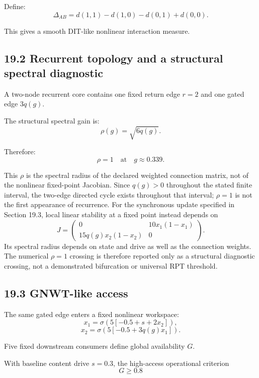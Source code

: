 \documentclass[
  11pt,
  a4paper,
]{article}
\begin{document}
Define:
\nopagebreak[4]
\[
\Delta_{AB}
=
d(1,1)-d(1,0)-d(0,1)+d(0,0).
\]

This gives a smooth DIT-like nonlinear interaction measure.

\hypertarget{recurrent-topology-and-a-structural-spectral-diagnostic}{%
\subsection{19.2 Recurrent topology and a structural spectral
diagnostic}\label{recurrent-topology-and-a-structural-spectral-diagnostic}}

A two-node recurrent core contains one fixed return edge \(r=2\) and one
gated edge \(3q(g)\).

The structural spectral gain is:
\nopagebreak[4]
\[
\rho(g)=\sqrt{6q(g)}.
\]

Therefore:
\nopagebreak[4]
\[
\boxed{
\rho=1
\quad\text{at}\quad
g\approx0.339.
}
\]

This \(\rho\) is the spectral radius of the declared weighted connection
matrix, not of the nonlinear fixed-point Jacobian. Since \(q(g)>0\)
throughout the stated finite interval, the two-edge directed cycle
exists throughout that interval; \(\rho=1\) is not the first appearance
of recurrence. For the synchronous update specified in Section 19.3,
local linear stability at a fixed point instead depends on \[
J=\begin{pmatrix}
0 & 10x_1(1-x_1)\\
15q(g)x_2(1-x_2) & 0
\end{pmatrix}.
\] Its spectral radius depends on state and drive as well as the
connection weights. The numerical \(\rho=1\) crossing is therefore
reported only as a structural diagnostic crossing, not a demonstrated
bifurcation or universal RPT threshold.

\hypertarget{gnwt-like-access}{%
\subsection{19.3 GNWT-like access}\label{gnwt-like-access}}

The same gated edge enters a fixed nonlinear workspace:
\nopagebreak[4]
\[
x_1=\sigma(5[-0.5+s+2x_2]),
\]
\nopagebreak[4]
\[
x_2=\sigma(5[-0.5+3q(g)x_1]).
\]

Five fixed downstream consumers define global availability \(G\).

With baseline content drive \(s=0.3\), the high-access operational
criterion
\nopagebreak[4]
\[
G\ge0.8
\]
\end{document}
